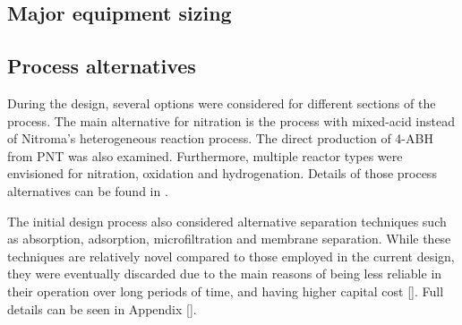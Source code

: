 \subsection{Major equipment sizing}


\subsection{Process alternatives}
During the design, several options were considered for different sections of the process. The main alternative for nitration is the process with mixed-acid instead of Nitroma's heterogeneous reaction process. The direct production of 4-ABH from PNT was also examined. Furthermore, multiple reactor types were envisioned for nitration, oxidation and hydrogenation. Details of those process alternatives can be found in .

The initial design process also considered alternative separation techniques such as absorption, adsorption, microfiltration and membrane separation. While these techniques are relatively novel compared to those employed in the current design, they were eventually discarded due to the main reasons of being less reliable in their operation over long periods of time, and having higher capital cost []. Full details can be seen in Appendix [].



